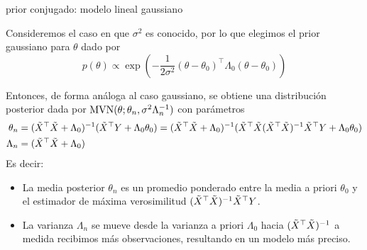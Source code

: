 \documentclass[9pt]{beamer}
\begin{document}
\begin{frame}{prior conjugado: modelo lineal gaussiano}

Consideremos el caso en que $\sigma^2$ es conocido, por lo que elegimos el prior gaussiano para $\theta$ dado por
\begin{equation*}
	p(\theta) \propto \exp\left(-\frac{1}{2\sigma^2}(\theta-\theta_0)^\top\Lambda_0(\theta-\theta_0)\right)
\end{equation*}\pause

Entonces, de forma análoga al caso gaussiano, se obtiene una distribución posterior dada por $\operatorname{\text{MVN}}(\theta; \theta_n,\sigma^2\Lambda_n^{-1})$ con parámetros 
\begin{align*}
	\theta_n &= (\tilde{X}^\top \tilde{X} + \Lambda_0)^{-1} (\tilde{X}^\top  Y + \Lambda_0\theta_0) = (\tilde{X}^\top \tilde{X} + \Lambda_0)^{-1} (\tilde{X}^\top \tilde{X} (\tilde{X}^\top \tilde{X})^{-1}\tilde{X}^\top  Y + \Lambda_0\theta_0)\label{eq:mean_post_lin_g}\\
	\Lambda_n &= (\tilde{X}^\top \tilde{X} + \Lambda_0)
\end{align*}\pause
Es decir:

\begin{itemize}
	\item La media posterior $\theta_n$ es un promedio ponderado entre la media a priori $\theta_0$ y el estimador de máxima verosimilitud $(\tilde{X}^\top \tilde{X})^{-1}\tilde{X}^\top  Y$.
	\item La varianza $\Lambda_n$ se mueve desde la varianza a priori $\Lambda_0$ hacia $(\tilde{X}^\top \tilde{X})^{-1}$ a medida recibimos más observaciones, resultando en un modelo más preciso.
\end{itemize}
	
\end{frame}
\end{document}
